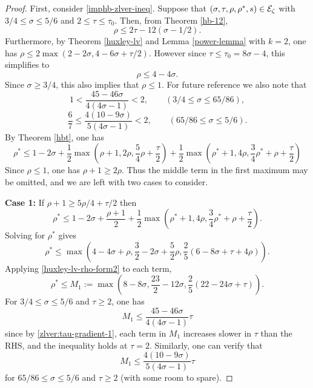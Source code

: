 \begin{proof}
First, consider \eqref{imphb-zlver-ineq}. Suppose that $(\sigma, \tau, \rho, \rho^*, s)\in \mathcal{E}_\zeta$ with $3/4 \le \sigma \le 5/6$ and $2 \le \tau \le \tau_0$. Then, from Theorem \ref{hb-12},
\begin{equation}\label{hb-lv-rho-form}
\rho \le 2\tau - 12(\sigma - 1/2).
\end{equation}
Furthermore, by Theorem \ref{huxley-lv} and Lemma \ref{power-lemma} with $k = 2$, one has $\rho \le 2\max(2 - 2\sigma, 4 - 6\sigma + \tau/2)$. However since $\tau \le \tau_0 = 8\sigma - 4$, this simplifies to 
\begin{equation}
\label{huxley-lv-rho-form2}
\rho \le 4 - 4\sigma.
\end{equation}
Since $\sigma \ge 3/4$, this also implies that $\rho \le 1$. For future reference we also note that 
\begin{equation}\label{zlver:tau-gradient-1}
1 < \frac{45 - 46\sigma}{4(4\sigma - 1)} < 2,\qquad (3/4 \le \sigma \le 65/86),
\end{equation}
\begin{equation}\label{zlver:tau-gradient-2}
\frac{6}{7} \le \frac{4(10 - 9\sigma)}{5(4\sigma - 1)} < 2,\qquad (65/86 \le \sigma \le 5/6).
\end{equation}
By Theorem \ref{hbt}, one has
\[
\rho^* \leq 1-2\sigma + \frac{1}{2}\max(\rho+1, 2\rho, \frac{5}{4}\rho+\frac{\tau}{2}) + \frac{1}{2}\max(\rho^*+1, 4\rho, \frac{3}{4}\rho^*+\rho+\frac{\tau}{2})
\]
Since $\rho \le 1$, one has $\rho + 1 \ge 2\rho$. Thus the middle term in the first maximum may be omitted, and we are left with two cases to consider. 

\textbf{Case 1:} If $\rho + 1 \ge 5\rho/4 + \tau/2$ then 
\[
\rho^* \le 1 -2\sigma + \frac{\rho + 1}{2} + \frac{1}{2}\max(\rho^* + 1, 4\rho, \frac{3}{4}\rho^*+\rho +\frac{\tau}{2}).
\]
Solving for $\rho^*$ gives 
\[
\rho^* \le \max(4 - 4\sigma + \rho, \frac{3}{2} - 2\sigma + \frac{5}{2}\rho, \frac{2}{5}(6 - 8\sigma + \tau + 4\rho)).
\]
Applying \eqref{huxley-lv-rho-form2} to each term,
\[
\rho^* \le M_1 := \max(8 - 8\sigma, \frac{23}{2} - 12\sigma, \frac{2}{5}(22 - 24\sigma + \tau)).
\]
For $3/4 \le \sigma \le 5/6$ and $\tau \ge 2$, one has 
\[
M_1 \le \frac{45 - 46\sigma}{4(4\sigma - 1)}\tau
\]
since by \eqref{zlver:tau-gradient-1}, each term in $M_1$ increases slower in $\tau$ than the RHS, and the inequality holds at $\tau = 2$. Similarly, one can verify that
\[
M_1 \le \frac{4(10 - 9\sigma)}{5(4\sigma - 1)}\tau
\]
for $65/86 \le \sigma \le 5/6$ and $\tau \ge 2$ (with some room to spare). 


\end{proof}
